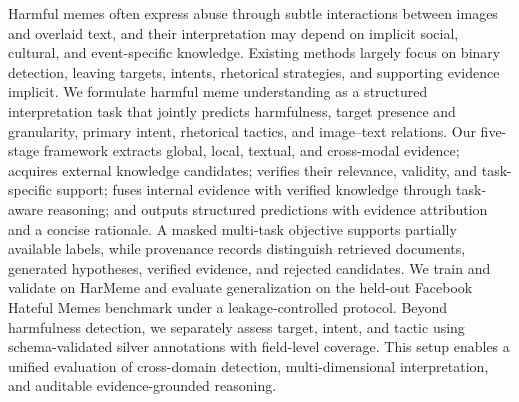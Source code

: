 Harmful memes often express abuse through subtle interactions between images
and overlaid text, and their interpretation may depend on implicit social,
cultural, and event-specific knowledge. Existing methods largely focus on
binary detection, leaving targets, intents, rhetorical strategies, and
supporting evidence implicit. We formulate harmful meme understanding as a
structured interpretation task that jointly predicts harmfulness, target
presence and granularity, primary intent, rhetorical tactics, and image--text
relations. Our five-stage framework extracts global, local, textual, and
cross-modal evidence; acquires external knowledge candidates; verifies their
relevance, validity, and task-specific support; fuses internal evidence with
verified knowledge through task-aware reasoning; and outputs structured
predictions with evidence attribution and a concise rationale. A masked
multi-task objective supports partially available labels, while provenance
records distinguish retrieved documents, generated hypotheses, verified
evidence, and rejected candidates. We train and validate on HarMeme and
evaluate generalization on the held-out Facebook Hateful Memes benchmark under
a leakage-controlled protocol. Beyond harmfulness detection, we separately
assess target, intent, and tactic using schema-validated silver annotations
with field-level coverage. This setup enables a unified evaluation of
cross-domain detection, multi-dimensional interpretation, and auditable
evidence-grounded reasoning.